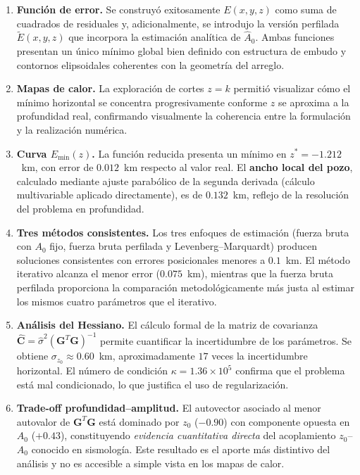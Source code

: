 \documentclass[12pt, a4paper]{article}
\begin{document}
\begin{enumerate}

    \item \textbf{Función de error.} Se construyó exitosamente
    $E(x,y,z)$ como suma de cuadrados de residuales y, adicionalmente,
    se introdujo la versión perfilada $\widetilde{E}(x,y,z)$ que
    incorpora la estimación analítica de $\widehat{A}_0$. Ambas
    funciones presentan un único mínimo global bien definido con
    estructura de embudo y contornos elipsoidales coherentes con la
    geometría del arreglo.

    \item \textbf{Mapas de calor.} La exploración de cortes $z = k$
    permitió visualizar cómo el mínimo horizontal se concentra
    progresivamente conforme $z$ se aproxima a la profundidad real,
    confirmando visualmente la coherencia entre la formulación y la
    realización numérica.

    \item \textbf{Curva $E_{\min}(z)$.} La función reducida presenta un
    mínimo en $z^* = -1.212$~km, con error de $0.012$~km respecto al
    valor real. El \textbf{ancho local del pozo}, calculado mediante
    ajuste parabólico de la segunda derivada (cálculo multivariable
    aplicado directamente), es de $0.132$~km, reflejo de la resolución
    del problema en profundidad.

    \item \textbf{Tres métodos consistentes.} Los tres enfoques de
    estimación (fuerza bruta con $A_0$ fijo, fuerza bruta perfilada y
    Levenberg--Marquardt) producen soluciones consistentes con errores
    posicionales menores a $0.1$~km. El método iterativo alcanza el
    menor error ($0.075$~km), mientras que la fuerza bruta perfilada
    proporciona la comparación metodológicamente más justa al estimar
    los mismos cuatro parámetros que el iterativo.

    \item \textbf{Análisis del Hessiano.} El cálculo formal de la
    matriz de covarianza $\widehat{\mathbf{C}} = \hat{\sigma}^2
    (\mathbf{G}^T\mathbf{G})^{-1}$ permite cuantificar la incertidumbre
    de los parámetros. Se obtiene $\sigma_{z_0} \approx 0.60$~km,
    aproximadamente $17$ veces la incertidumbre horizontal. El número
    de condición $\kappa = 1.36\times 10^{5}$ confirma que el problema
    está mal condicionado, lo que justifica el uso de regularización.

    \item \textbf{Trade-off profundidad--amplitud.} El autovector
    asociado al menor autovalor de $\mathbf{G}^T\mathbf{G}$ está
    dominado por $z_0$ ($-0.90$) con componente opuesta en $A_0$
    ($+0.43$), constituyendo \emph{evidencia cuantitativa directa}
    del acoplamiento $z_0$--$A_0$ conocido en sismología. Este
    resultado es el aporte más distintivo del análisis y no es
    accesible a simple vista en los mapas de calor.


\end{enumerate}
\end{document}
